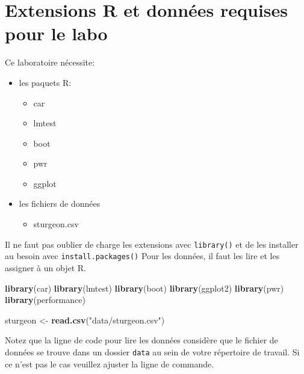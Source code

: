 \documentclass[
  12pt,
]{book}
\makeatletter
\newenvironment{Shaded}{\begin{snugshade}}{\end{snugshade}}
\newcommand{\KeywordTok}[1]{\textcolor[rgb]{0.13,0.29,0.53}{\textbf{#1}}}
\newcommand{\NormalTok}[1]{#1}
\newcommand{\StringTok}[1]{\textcolor[rgb]{0.31,0.60,0.02}{#1}}
\providecommand{\tightlist}{%
  \setlength{\itemsep}{0pt}\setlength{\parskip}{0pt}}
\newenvironment{kframe}{%
\medskip{}
\setlength{\fboxsep}{.8em}
\def\at@end@of@kframe{}%
\ifinner\ifhmode%
 \def\at@end@of@kframe{\end{minipage}}%
 \begin{minipage}{\columnwidth}%
\fi\fi%
\def\FrameCommand##1{\hskip\@totalleftmargin \hskip-\fboxsep
\colorbox{incolor}{##1}\hskip-\fboxsep
    \hskip-\linewidth \hskip-\@totalleftmargin \hskip\columnwidth}%
\MakeFramed {\advance\hsize-\width
  \@totalleftmargin\z@ \linewidth\hsize
  \@setminipage}}%
{\par\unskip\endMakeFramed%
\at@end@of@kframe}
\newenvironment{rmdblock}[1]
 {
 \begin{itemize}
 \renewcommand{\labelitemi}{
   \raisebox{-.7\height}[0pt][0pt]{
     {\setkeys{Gin}{width=3em,keepaspectratio}\texttt{[image: images/\#1]}}
   }
 }
 \begin{kframe}
 \setlength{\fboxsep}{1em}
 \item
 }
 {
 \end{kframe}
 \end{itemize}
 }
\newenvironment{rmdnote}
  {\begin{rmdblock}{note}}
  {\end{rmdblock}}
\makeatother
\begin{document}
\hypertarget{set-lm}{%
\section{Extensions R et données requises pour le labo}\label{set-lm}}

Ce laboratoire nécessite:

\begin{itemize}
\tightlist
\item
  les paquets R:

  \begin{itemize}
  \tightlist
  \item
    car
  \item
    lmtest
  \item
    boot
  \item
    pwr
  \item
    ggplot
  \end{itemize}
\item
  les fichiers de données

  \begin{itemize}
  \tightlist
  \item
    sturgeon.csv
  \end{itemize}
\end{itemize}

Il ne faut pas oublier de charge les extensions avec \texttt{library()} et de les installer au besoin avec \texttt{install.packages()}
Pour les données, il faut les lire et les assigner à un objet R.

\begin{Shaded}
\begin{Highlighting}[]
\KeywordTok{library}\NormalTok{(car)}
\KeywordTok{library}\NormalTok{(lmtest)}
\KeywordTok{library}\NormalTok{(boot)}
\KeywordTok{library}\NormalTok{(ggplot2)}
\KeywordTok{library}\NormalTok{(pwr)}
\KeywordTok{library}\NormalTok{(performance)}

\NormalTok{sturgeon \textless{}{-}}\StringTok{ }\KeywordTok{read.csv}\NormalTok{(}\StringTok{"data/sturgeon.csv"}\NormalTok{)}
\end{Highlighting}
\end{Shaded}

\begin{rmdnote}
Notez que la ligne de code pour lire les données considère que le fichier de données se trouve dans un dossier \texttt{data} au sein de votre répertoire de travail. Si ce n'est pas le cas veuillez ajuster la ligne de commande.
\end{rmdnote}
\end{document}
